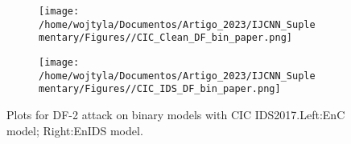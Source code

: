 \documentclass[conference]{IEEEtran}
\begin{document}
	\begin{figure}[H]
		\centering
		\begin{subfigure}[b]{0.45\textwidth}
			\texttt{[image: /home/wojtyla/Documentos/Artigo\_2023/IJCNN\_Suplementary/Figures//CIC\_Clean\_DF\_bin\_paper.png]}
			\label{fig:1}
		\end{subfigure}
		\hfill
		\begin{subfigure}[b]{0.45\textwidth}
			\texttt{[image: /home/wojtyla/Documentos/Artigo\_2023/IJCNN\_Suplementary/Figures//CIC\_IDS\_DF\_bin\_paper.png]}
			\label{fig:4}
		\end{subfigure}
		\caption{Plots for DF-2 attack on binary models with CIC IDS2017.Left:EnC model; Right:EnIDS model.}
		\label{fig:cic_df_bin}
	\end{figure}
	
\end{document}

